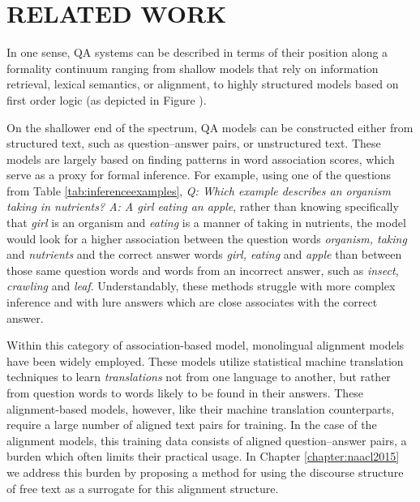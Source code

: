 \chapter{RELATED WORK\label{chapter:related_work}}

In one sense, QA systems can be described in terms of their position along a formality continuum ranging from shallow models that rely on information retrieval, lexical semantics, or alignment, to highly structured models based on first order logic (as depicted in Figure ).

On the shallower end of the spectrum,  QA models can be constructed either from structured text, such as question--answer pairs, or unstructured text.  These models are largely based on finding patterns in word association scores, which serve as a proxy for formal inference.  For example, using one of the questions from Table \ref{tab:inferenceexamples}, \emph{Q: Which example describes an organism taking in nutrients? A: A girl eating an apple}, rather than knowing specifically that \emph{girl} is an organism and \emph{eating} is a manner of taking in nutrients, the model would look for a higher association between the question words \emph{organism, taking} and \emph{nutrients} and the correct answer words \emph{girl, eating} and \emph{apple} than between those same question words and words from an incorrect answer, such as \emph{insect, crawling} and \emph{leaf}.  Understandably, these methods struggle with more complex inference and with lure answers which are close associates with the correct answer. 

Within this category of association-based model, monolingual alignment models~\citep{Berger:00,echihabi2003noisy,Soricut:06,Riezler:etal:2007,Surdeanu:11,yao2013} have been widely employed.  These models utilize statistical machine translation techniques to learn \textit{translations} not from one language to another, but rather from question words to words likely to be found in their answers.  These alignment-based models, however, like their machine translation counterparts, require a large number of aligned text pairs for training.  In the case of the alignment models, this training data consists of aligned question--answer pairs, a burden which often limits their practical usage.  In Chapter \ref{chapter:naacl2015} we address this burden by proposing a method for using the discourse structure of free text as a surrogate for this alignment structure. %

